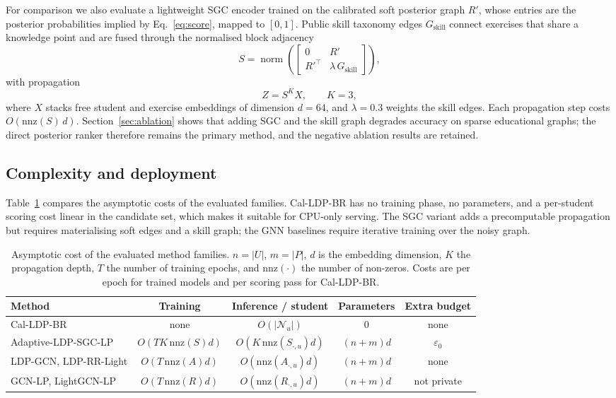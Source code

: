 \documentclass[pdflatex,sn-basic,Numbered]{sn-jnl}
\theoremstyle{plain}
\theoremstyle{remark}
\theoremstyle{definition}
\newcommand{\eps}{\varepsilon}
\begin{document}
For comparison we also evaluate a lightweight SGC encoder trained on the calibrated soft posterior graph $R'$, whose entries are the posterior probabilities implied by Eq.~\eqref{eq:score}, mapped to $[0,1]$. Public skill taxonomy edges $G_{\text{skill}}$ connect exercises that share a knowledge point and are fused through the normalised block adjacency
\begin{equation}\label{eq:blockadj}
S=\operatorname{norm}\!\left(\begin{bmatrix}0 & R'\\ R'^{\top} & \lambda\,G_{\text{skill}}\end{bmatrix}\right),
\end{equation}
with propagation
\begin{equation}\label{eq:sgc}
Z=S^{K}X,\qquad K=3,
\end{equation}
where $X$ stacks free student and exercise embeddings of dimension $d=64$, and $\lambda=0.3$ weights the skill edges. Each propagation step costs $O(\mathrm{nnz}(S)\,d)$. Section~\ref{sec:ablation} shows that adding SGC and the skill graph degrades accuracy on sparse educational graphs; the direct posterior ranker therefore remains the primary method, and the negative ablation results are retained.

\subsection{Complexity and deployment}\label{sec:complexity}

Table~\ref{tab:complexity} compares the asymptotic costs of the evaluated families. Cal-LDP-BR has no training phase, no parameters, and a per-student scoring cost linear in the candidate set, which makes it suitable for CPU-only serving. The SGC variant adds a precomputable propagation but requires materialising soft edges and a skill graph; the GNN baselines require iterative training over the noisy graph.

\begin{table}[t]
\caption{Asymptotic cost of the evaluated method families. $n=|U|$, $m=|P|$, $d$ is the embedding dimension, $K$ the propagation depth, $T$ the number of training epochs, and $\mathrm{nnz}(\cdot)$ the number of non-zeros. Costs are per epoch for trained models and per scoring pass for Cal-LDP-BR.}
\label{tab:complexity}
\footnotesize
\setlength{\tabcolsep}{3.5pt}
\begin{tabular}{@{}lcccc@{}}
\toprule
Method & Training & Inference / student & Parameters & Extra budget \\
\midrule
Cal-LDP-BR & none & $O(|\mathcal{N}_u|)$ & $0$ & none \\
Adaptive-LDP-SGC-LP & $O(TK\,\mathrm{nnz}(S)d)$ & $O(K\,\mathrm{nnz}(S_{\cdot,u})d)$ & $(n+m)d$ & $\eps_0$ \\
LDP-GCN, LDP-RR-Light & $O(T\,\mathrm{nnz}(A)d)$ & $O(\mathrm{nnz}(A_{\cdot,u})d)$ & $(n+m)d$ & none \\
GCN-LP, LightGCN-LP & $O(T\,\mathrm{nnz}(R)d)$ & $O(\mathrm{nnz}(R_{\cdot,u})d)$ & $(n+m)d$ & not private \\
\bottomrule
\end{tabular}
\end{table}
\end{document}
